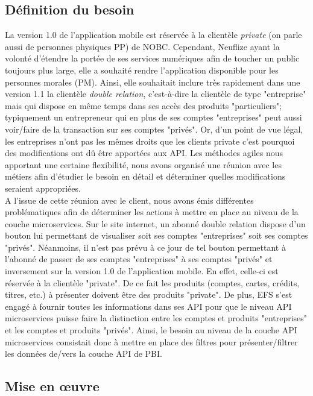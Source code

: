 \subsection{Définition du besoin}	
	
	La version 1.0 de l’application mobile est réservée à la clientèle \textit{private} (on parle aussi de personnes physiques PP) de NOBC. Cependant, Neuflize ayant la volonté d'étendre la portée de ses services numériques afin de toucher un public toujours plus large, elle a souhaité rendre l'application disponible pour les personnes morales (PM). Ainsi, elle souhaitait inclure très rapidement dans une version 1.1 la clientèle \textit{double relation}, c’est-à-dire la clientèle de type "entreprise" mais qui dispose en même temps dans ses accès des produits "particuliers"; typiquement un entrepreneur qui en plus de ses comptes "entreprises" peut aussi voir/faire de la transaction sur ses comptes "privés". Or, d'un point de vue légal, les entreprises n'ont pas les mêmes droits que les clients private c'est pourquoi des modifications ont dû être apportées aux API. Les méthodes agiles nous apportant une certaine flexibilité, nous avons organisé une réunion avec les métiers afin d'étudier le besoin en détail et déterminer quelles modifications seraient appropriées. \\
	
	A l'issue de cette réunion avec le client, nous avons émis différentes problématiques afin de déterminer les actions à mettre en place au niveau de la couche microservices. Sur le site internet, un abonné double relation dispose d’un bouton lui permettant de visualiser soit ses comptes "entreprises" soit ses comptes "privés". Néanmoins, il n’est pas prévu à ce jour de tel bouton permettant à l’abonné de passer de ses comptes "entreprises" à ses comptes "privés" et inversement sur la version 1.0 de l'application mobile. En effet, celle-ci est réservée à la clientèle "private". De ce fait les produits (comptes, cartes, crédits, titres, etc.) à présenter doivent être des produits "private". De plus, EFS s’est engagé à fournir toutes les informations dans ses API pour que le niveau API microservices puisse faire la distinction entre les comptes et produits "entreprises" et les comptes et produits "privés". Ainsi, le besoin au niveau de la couche API microservices consistait donc à mettre en place des filtres pour présenter/filtrer les données de/vers la couche API de PBI.
	
\subsection{Mise en œuvre}
	
